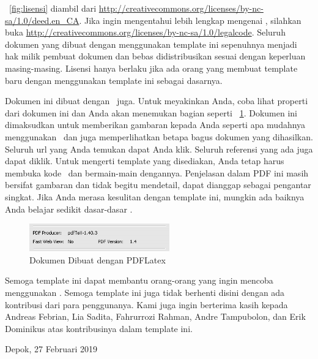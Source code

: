 \pic~\ref{fig:lisensi} diambil dari 
\url{http://creativecommons.org/licenses/by-nc-sa/1.0/deed.en_CA}. 
Jika ingin mengentahui lebih lengkap mengenai \license, silahkan buka 
\url{http://creativecommons.org/licenses/by-nc-sa/1.0/legalcode}. 
Seluruh dokumen yang dibuat dengan menggunakan template ini sepenuhnya 
menjadi hak milik pembuat dokumen dan bebas didistribusikan sesuai dengan 
keperluan masing-masing. 
Lisensi hanya berlaku jika ada orang yang membuat template baru dengan 
menggunakan template ini sebagai dasarnya. 

Dokumen ini dibuat dengan \latex~juga. Untuk meyakinkan Anda, coba lihat 
properti dari dokumen ini dan Anda akan menemukan bagian seperti 
\pic~\ref{fig:pdflatex}. 
Dokumen ini dimaksudkan untuk memberikan gambaran kepada Anda seperti apa 
mudahnya menggunakan \latex~dan juga memperlihatkan betapa bagus dokumen 
yang dihasilkan. 
Seluruh url yang Anda temukan dapat Anda klik. 
Seluruh referensi yang ada juga dapat diklik. 
Untuk mengerti template yang disediakan, Anda tetap harus membuka kode 
\latex~dan bermain-main dengannya. 
Penjelasan dalam PDF ini masih bersifat gambaran dan tidak begitu 
mendetail, dapat dianggap sebagai pengantar singkat. 
Jika Anda merasa kesulitan dengan template ini, mungkin ada baiknya 
Anda belajar sedikit dasar-dasar \latex. 

\begin{figure}
	\centering
	\includegraphics[width=0.54\textwidth]
		{assets/pics/mark.png}
	\caption{Dokumen Dibuat dengan PDFLatex}
	\label{fig:pdflatex}
\end{figure}

Semoga template ini dapat membantu orang-orang yang ingin mencoba menggunakan 
\latex. Semoga template ini juga tidak berhenti disini dengan ada kontribusi 
dari para penggunanya. 
Kami juga ingin berterima kasih kepada Andreas Febrian, Lia Sadita, Fahrurrozi 
Rahman, Andre Tampubolon, dan Erik Dominikus atas kontribusinya dalam template 
ini. 

\vspace*{0.1cm}
\begin{flushright}
Depok, 27 Februari 2019\\[0.1cm]
\vspace*{1cm}
\penulis

\end{flushright}